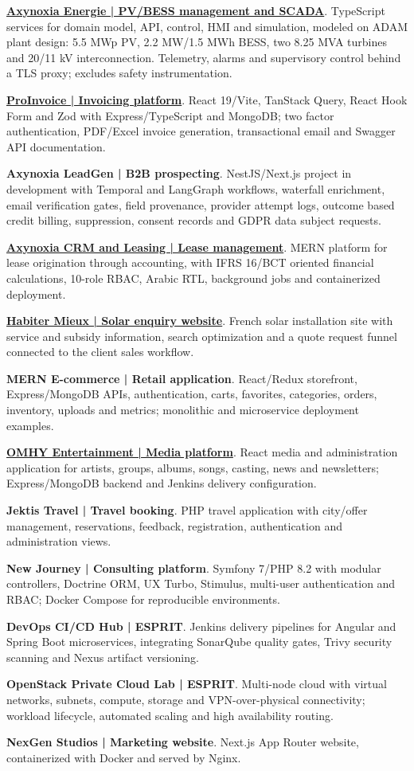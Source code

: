 \documentclass[11pt,a4paper]{article}
\newcommand{\project}[2]{\Needspace{3\baselineskip}\textbf{#1}. #2\par}
\begin{document}
\project{\href{https://energie.products.axynoxia.com}{Axynoxia Energie | PV/BESS management and SCADA}}{TypeScript services for domain model, API, control, HMI and simulation, modeled on ADAM plant design: 5.5 MWp PV, 2.2 MW/1.5 MWh BESS, two 8.25 MVA turbines and 20/11 kV interconnection. Telemetry, alarms and supervisory control behind a TLS proxy; excludes safety instrumentation.}
\project{\href{https://invoice.products.axynoxia.com}{ProInvoice | Invoicing platform}}{React 19/Vite, TanStack Query, React Hook Form and Zod with Express/TypeScript and MongoDB; two factor authentication, PDF/Excel invoice generation, transactional email and Swagger API documentation.}
\project{Axynoxia LeadGen | B2B prospecting}{NestJS/Next.js project in development with Temporal and LangGraph workflows, waterfall enrichment, email verification gates, field provenance, provider attempt logs, outcome based credit billing, suppression, consent records and GDPR data subject requests.}
\project{\href{https://crm-leasing.products.axynoxia.com}{Axynoxia CRM and Leasing | Lease management}}{MERN platform for lease origination through accounting, with IFRS 16/BCT oriented financial calculations, 10-role RBAC, Arabic RTL, background jobs and containerized deployment.}
\project{\href{https://habiter-mieux.info/}{Habiter Mieux | Solar enquiry website}}{French solar installation site with service and subsidy information, search optimization and a quote request funnel connected to the client sales workflow.}
\project{MERN E-commerce | Retail application}{React/Redux storefront, Express/MongoDB APIs, authentication, carts, favorites, categories, orders, inventory, uploads and metrics; monolithic and microservice deployment examples.}
\project{\href{https://omhyfamily.com/}{OMHY Entertainment | Media platform}}{React media and administration application for artists, groups, albums, songs, casting, news and newsletters; Express/MongoDB backend and Jenkins delivery configuration.}
\project{Jektis Travel | Travel booking}{PHP travel application with city/offer management, reservations, feedback, registration, authentication and administration views.}
\project{New Journey | Consulting platform}{Symfony 7/PHP 8.2 with modular controllers, Doctrine ORM, UX Turbo, Stimulus, multi-user authentication and RBAC; Docker Compose for reproducible environments.}
\project{DevOps CI/CD Hub | ESPRIT}{Jenkins delivery pipelines for Angular and Spring Boot microservices, integrating SonarQube quality gates, Trivy security scanning and Nexus artifact versioning.}
\project{OpenStack Private Cloud Lab | ESPRIT}{Multi-node cloud with virtual networks, subnets, compute, storage and VPN-over-physical connectivity; workload lifecycle, automated scaling and high availability routing.}
\project{NexGen Studios | Marketing website}{Next.js App Router website, containerized with Docker and served by Nginx.}
\end{document}
